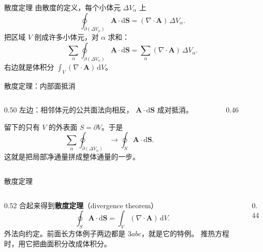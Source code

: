 \documentclass[fontset=windows, chinese, 10pt, xcolor=dvipsnames]{beamer}
\begin{document}
\begin{frame}{散度定理}
  由散度的定义，每个小体元 $\Delta V_\alpha$ 上
  \begin{equation*}
    \oint_{\partial(\Delta V_\alpha)}\mathbf{A}\cdot\mathrm{d}\mathbf{S}
    =(\nabla\cdot\mathbf{A})\,\Delta V_\alpha.
  \end{equation*}
  把区域 $V$ 剖成许多小体元，对 $\alpha$ 求和：
  \begin{equation*}
    \sum_\alpha
      \oint_{\partial(\Delta V_\alpha)}\mathbf{A}\cdot\mathrm{d}\mathbf{S}
    =\sum_\alpha(\nabla\cdot\mathbf{A})\,\Delta V_\alpha.
  \end{equation*}
  右边就是体积分
  $\displaystyle\int_V(\nabla\cdot\mathbf{A})\,\mathrm{d}V$。
\end{frame}

\begin{frame}{散度定理：内部面抵消}
  \begin{columns}[c]
    \begin{column}{0.50\textwidth}
      左边：相邻体元的公共面法向相反，
      $\mathbf{A}\cdot\mathrm{d}\mathbf{S}$ 成对抵消。
      \vspace{0.3em}

      留下的只有 $V$ 的外表面 $S=\partial V$。于是
      \begin{equation*}
        \sum_\alpha\oint_{\partial(\Delta V_\alpha)}
        \longrightarrow
        \oint_S\mathbf{A}\cdot\mathrm{d}\mathbf{S}.
      \end{equation*}
      这就是把局部净通量拼成整体通量的一步。
    \end{column}
    \begin{column}{0.46\textwidth}
      \centering
      \scalebox{0.82}{}
    \end{column}
  \end{columns}
\end{frame}

\begin{frame}{散度定理}
  \begin{columns}[c]
    \begin{column}{0.52\textwidth}
      合起来得到\textbf{散度定理}（divergence theorem）
      \begin{equation*}
        \boxed{\displaystyle
          \oint_S\mathbf{A}\cdot\mathrm{d}\mathbf{S}
          =\int_V(\nabla\cdot\mathbf{A})\,\mathrm{d}V.}
      \end{equation*}
      外法向约定。前面长方体例子两边都是 $3abc$，就是它的特例。
      推热方程时，用它把曲面积分改成体积分。
    \end{column}
    \begin{column}{0.44\textwidth}
      \centering
      \scalebox{0.85}{}
    \end{column}
  \end{columns}
\end{frame}
\end{document}
